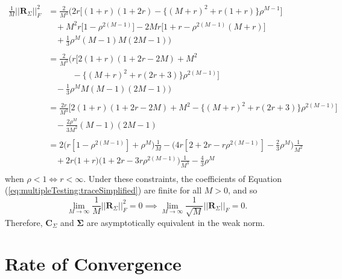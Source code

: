 \documentclass[letterpaper,12pt,oneside,final]{article}
\newcommand{\m}[1]{\mathbf{#1}}               %
\newcommand{\sm}[1]{\boldsymbol{#1}}   %
\newcommand{\norm}[1]{||{#1}||}              %
\newcommand{\frob}[1]{\norm{#1}_F}
\begin{document}
\begin{equation} \label{eq:multipleTesting:traceSimplified}
  \begin{aligned}
    \frac{1}{M} \frob{\m{R}_{\Sigma}}^2 & = \frac{2}{M^3} \bigg ( 2r  \Big [ (1 + r)(1 + 2r) - \{ (M + r)^2 + r(1 + r) \} \rho^{M-1} \Big ] \\
    & ~~~~ + M^2 r \Big [ 1 - \rho^{2(M-1)} \Big ] - 2Mr\Big [ 1 + r - \rho^{2(M-1)} ( M + r ) \Big ]  \\
    & ~~~~ + \frac{1}{3}\rho^M (M-1)M(2M-1) \bigg ) \\
    & \\
    & = \frac{2}{M^3} \bigg ( r \Big [ 2(1 + r)(1 + 2r - 2M) + M^2 \\
    & ~~~~~~~~~~~~~ - \big \{ (M+r)^2 + r(2r+3) \big \} \rho^{2(M-1)} \Big ] \\
    & ~~~~ - \frac{1}{3} \rho^M M(M-1)(2M-1) \bigg ) \\
    & \\
    & = \frac{2r}{M^3} \Big [ 2(1 + r)(1 + 2r - 2M) + M^2 - \big \{ (M+r)^2 + r(2r+3) \big \} \rho^{2(M-1)} \Big ] \\
    & ~~~~ - \frac{2 \rho^M}{3 M^2} (M-1)(2M-1) \\
    & \\
    & = 2 \Big ( r [ 1 - \rho^{2(M-1)} ] + \rho^M \Big ) \frac{1}{M} - \Big ( 4r [ 2 + 2r - r\rho^{2(M-1)} ] - \frac{2}{3} \rho^M \Big ) \frac{1}{M^2} \\
    & ~~~~ + 2r \Big ( 1 + r \Big ) \Big ( 1 + 2r - 3r \rho^{2(M-1)} \Big ) \frac{1}{M^3} - \frac{4}{3} \rho^M \\
  \end{aligned}
\end{equation}
when $\rho < 1 \iff r < \infty$. Under these constraints, the coefficients of Equation (\ref{eq:multipleTesting:traceSimplified}) are finite for all $M > 0$, and so
\begin{equation*}
  \lim_{M \rightarrow \infty} \frac{1}{M} \frob{\m{R}_{\Sigma}}^2 = 0 \implies \lim_{M \rightarrow \infty} \frac{1}{\sqrt{M}} \frob{\m{R}_{\Sigma}} = 0.
\end{equation*}
Therefore, $\m{C}_{\Sigma}$ and $\sm{\Sigma}$ are asymptotically equivalent in the weak norm.

\section{Rate of Convergence} \label{c:multipleTesting:rateConverge}
\end{document}
